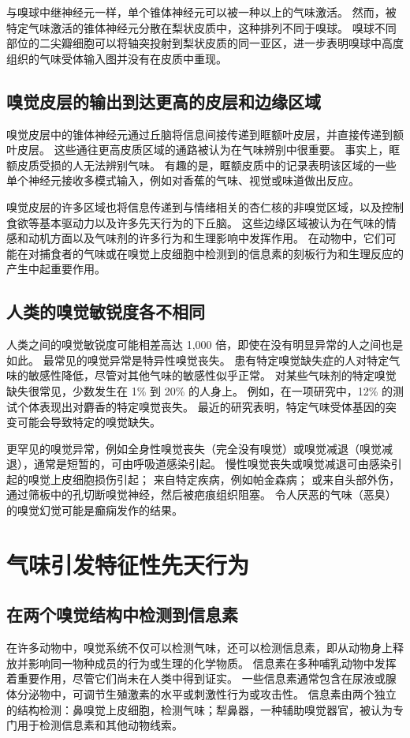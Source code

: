 与嗅球中继神经元一样，单个锥体神经元可以被一种以上的气味激活。 然而，被特定气味激活的锥体神经元分散在梨状皮质中，这种排列不同于嗅球。 嗅球不同部位的二尖瓣细胞可以将轴突投射到梨状皮质的同一亚区，进一步表明嗅球中高度组织的气味受体输入图并没有在皮质中重现。

\subsection{嗅觉皮层的输出到达更高的皮层和边缘区域}
嗅觉皮层中的锥体神经元通过丘脑将信息间接传递到眶额叶皮层，并直接传递到额叶皮层。 这些通往更高皮质区域的通路被认为在气味辨别中很重要。 事实上，眶额皮质受损的人无法辨别气味。 有趣的是，眶额皮质中的记录表明该区域的一些单个神经元接收多模式输入，例如对香蕉的气味、视觉或味道做出反应。

嗅觉皮层的许多区域也将信息传递到与情绪相关的杏仁核的非嗅觉区域，以及控制食欲等基本驱动力以及许多先天行为的下丘脑。 这些边缘区域被认为在气味的情感和动机方面以及气味剂的许多行为和生理影响中发挥作用。 在动物中，它们可能在对捕食者的气味或在嗅觉上皮细胞中检测到的信息素的刻板行为和生理反应的产生中起重要作用。


\subsection{人类的嗅觉敏锐度各不相同}
人类之间的嗅觉敏锐度可能相差高达 1,000 倍，即使在没有明显异常的人之间也是如此。 最常见的嗅觉异常是特异性嗅觉丧失。 患有特定嗅觉缺失症的人对特定气味的敏感性降低，尽管对其他气味的敏感性似乎正常。 对某些气味剂的特定嗅觉缺失很常见，少数发生在 1\% 到 20\% 的人身上。 例如，在一项研究中，12\% 的测试个体表现出对麝香的特定嗅觉丧失。 最近的研究表明，特定气味受体基因的突变可能会导致特定的嗅觉缺失。

更罕见的嗅觉异常，例如全身性嗅觉丧失（完全没有嗅觉）或嗅觉减退（嗅觉减退），通常是短暂的，可由呼吸道感染引起。 慢性嗅觉丧失或嗅觉减退可由感染引起的嗅觉上皮细胞损伤引起； 来自特定疾病，例如帕金森病； 或来自头部外伤，通过筛板中的孔切断嗅觉神经，然后被疤痕组织阻塞。 令人厌恶的气味（恶臭）的嗅觉幻觉可能是癫痫发作的结果。



\section{气味引发特征性先天行为}


\subsection{在两个嗅觉结构中检测到信息素}
在许多动物中，嗅觉系统不仅可以检测气味，还可以检测信息素，即从动物身上释放并影响同一物种成员的行为或生理的化学物质。 信息素在多种哺乳动物中发挥着重要作用，尽管它们尚未在人类中得到证实。 一些信息素通常包含在尿液或腺体分泌物中，可调节生殖激素的水平或刺激性行为或攻击性。 信息素由两个独立的结构检测：鼻嗅觉上皮细胞，检测气味；犁鼻器，一种辅助嗅觉器官，被认为专门用于检测信息素和其他动物线索。


